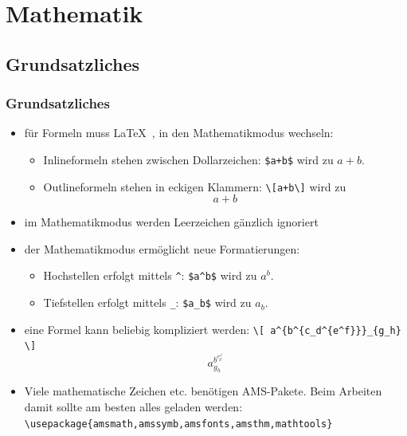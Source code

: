 \section{Mathematik}
\subsection{Grundsatzliches}

\begin{frame}[fragile]
\frametitle{Grundsatzliches}
\begin{itemize}[<+->]
  \item für Formeln muss \LaTeX~, in den Mathematikmodus wechseln:
  \begin{itemize}
    \item Inlineformeln stehen zwischen Dollarzeichen: \lstinline[style=Latex]!$a+b$! wird zu $a+b$.
    \item Outlineformeln stehen in eckigen Klammern: \lstinline[style=Latex]!\[a+b\]! wird zu \[a+b\]
  \end{itemize}
  \item im Mathematikmodus werden Leerzeichen gänzlich ignoriert
  \item der Mathematikmodus ermöglicht neue Formatierungen:
  \begin{itemize}
    \item Hochstellen erfolgt mittels \lstinline[style=Latex]+^+: \lstinline[style=Latex]+$a^b$+ wird zu $a^b$.
    \item Tiefstellen erfolgt mittels \lstinline[style=Latex]+_+: \lstinline[style=Latex]+$a_b$+ wird zu $a_b$.
  \end{itemize}
  \item eine Formel kann beliebig kompliziert werden:
  \lstinline[style=Latex]+\[ a^{b^{c_d^{e^f}}}_{g_h} \]+
  \[ a^{b^{c_d^{e^f}}}_{g_h} \]
  \item Viele mathematische Zeichen etc. benötigen AMS-Pakete. Beim Arbeiten damit sollte am besten alles geladen werden:
  \lstinline[style=Latex]+\usepackage{amsmath,amssymb,amsfonts,amsthm,mathtools}+
\end{itemize}
\end{frame}

